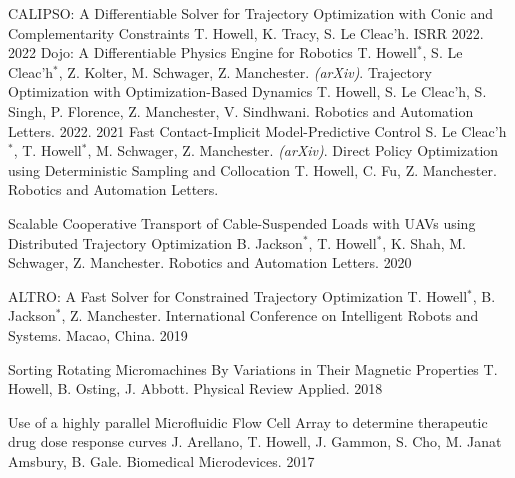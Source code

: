 


\begin{cvhonors}

	\cvhonor
	{CALIPSO: A Differentiable Solver for Trajectory Optimization with Conic and Complementarity Constraints} %
	{T. Howell, K. Tracy, S. Le Cleac'h. ISRR 2022.} %
	{}
	{2022} %
	\cvhonor
	{Dojo: A Differentiable Physics Engine for Robotics} %
	{T. Howell$^*$, S. Le Cleac'h$^*$, Z. Kolter, M. Schwager, Z. Manchester. \textit{(arXiv)}.} %
	{}
	{} %
   \cvhonor
	{Trajectory Optimization with Optimization-Based Dynamics} %
	{T. Howell, S. Le Cleac'h, S. Singh, P. Florence, Z. Manchester, V. Sindhwani. Robotics and Automation Letters. 2022.} %
	{}
	{2021} %
   \cvhonor
	{Fast Contact-Implicit Model-Predictive Control} %
	{S. Le Cleac'h$^*$, T. Howell$^*$, M. Schwager, Z. Manchester. \textit{(arXiv)}.} %
	{}
	{} %
  \cvhonor
    {Direct Policy Optimization using Deterministic Sampling and Collocation} %
    {T. Howell, C. Fu, Z. Manchester. Robotics and Automation Letters.} %
    {}
    {} %
    
  \cvhonor
    {Scalable Cooperative Transport of Cable-Suspended Loads with UAVs using Distributed Trajectory Optimization} %
    {B. Jackson$^*$, T. Howell$^*$, K. Shah, M. Schwager, Z. Manchester. Robotics and Automation Letters.} %
    {}
    {2020} %
    
  \cvhonor
    {ALTRO: A Fast Solver for Constrained Trajectory Optimization}
    {T. Howell$^*$, B. Jackson$^*$, Z. Manchester. International Conference on Intelligent Robots and Systems. Macao, China.}
    {}
    {2019}
    
  \cvhonor
    {Sorting Rotating Micromachines By Variations in Their Magnetic Properties}
    {T. Howell, B. Osting, J. Abbott. Physical Review Applied.} 
    {}
    {2018}
    
  \cvhonor
    {Use of a highly parallel Microfluidic Flow Cell Array to determine therapeutic drug dose response curves}
    {J. Arellano, T. Howell, J. Gammon, S. Cho, M. Janat Amsbury, B. Gale. Biomedical Microdevices.}
    {}
    {2017}
    
\end{cvhonors}
